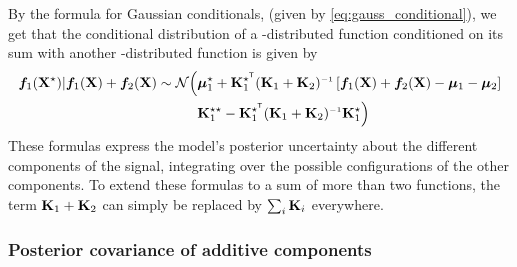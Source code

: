 By the formula for Gaussian conditionals, (given by \cref{eq:gauss_conditional}), we get that the conditional distribution of a \gp{}-distributed function conditioned on its sum with another \gp{}-distributed function is given by
%
\begin{align}
\vf_1(\vX^\star) | \vf_1(\vX) + \vf_2(\vX) \sim \Normal \Big( 
& \vmu_1^\star + \vK_1^{\star\tra} (\vK_1 + \vK_2)\inv \left[ \vf_1(\vX) + \vf_2(\vX) - \vmu_1 - \vmu_2 \right] \nonumber \\
& \vK_1^{\star\star} - \vK_1^{\star\tra} (\vK_1 + \vK_2)\inv \vK_1^{\star} \Big)
\end{align}
%
These formulas express the model's posterior uncertainty about the different components of the signal, integrating over the possible configurations of the other components.
To extend these formulas to a sum of more than two functions, the term $\mathbf{K}_1 + \mathbf{K}_2$ can simply be replaced by $\sum_i \mathbf{K}_i$ everywhere.




\subsubsection{Posterior covariance of additive components}

